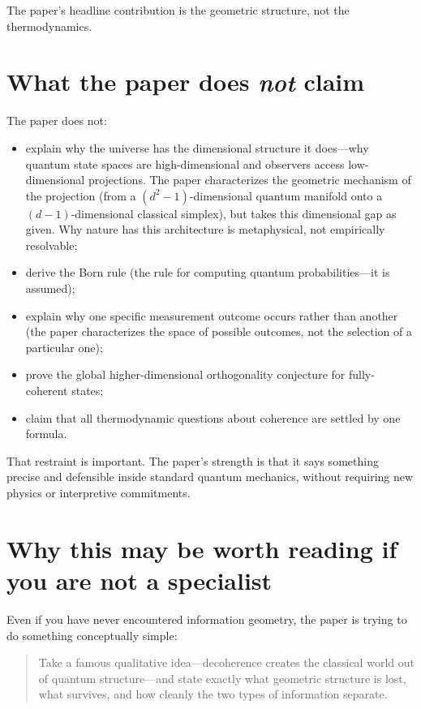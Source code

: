 \documentclass[11pt,a4paper]{article}
\begin{document}
The paper's headline contribution is the geometric structure, not the thermodynamics.

\section*{What the paper does \emph{not} claim}

The paper does not:
\begin{itemize}[leftmargin=1.5em]
\item explain why the universe has the dimensional structure it does---why quantum state spaces are high-dimensional and observers access low-dimensional projections.  The paper characterizes the geometric mechanism of the projection (from a $(d^2-1)$-dimensional quantum manifold onto a $(d-1)$-dimensional classical simplex), but takes this dimensional gap as given.  Why nature has this architecture is metaphysical, not empirically resolvable;
\item derive the Born rule (the rule for computing quantum probabilities---it is assumed);
\item explain why one specific measurement outcome occurs rather than another (the paper characterizes the space of possible outcomes, not the selection of a particular one);
\item prove the global higher-dimensional orthogonality conjecture for fully-coherent states;
\item claim that all thermodynamic questions about coherence are settled by one formula.
\end{itemize}

That restraint is important.  The paper's strength is that it says something precise and defensible inside standard quantum mechanics, without requiring new physics or interpretive commitments.

\section*{Why this may be worth reading if you are not a specialist}

Even if you have never encountered information geometry, the paper is trying to do something conceptually simple:

\begin{quote}
Take a famous qualitative idea---decoherence creates the classical world out of quantum structure---and state exactly what geometric structure is lost, what survives, and how cleanly the two types of information separate.
\end{quote}
\end{document}
